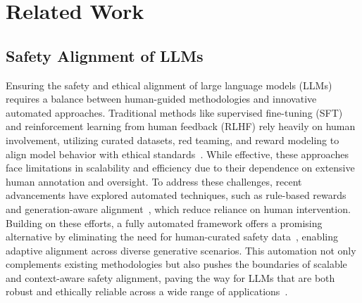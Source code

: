 \section{Related Work}

\subsection{Safety Alignment of LLMs} 
Ensuring the safety and ethical alignment of large language models (LLMs) requires a balance between human-guided methodologies and innovative automated approaches. Traditional methods like supervised fine-tuning (SFT) and reinforcement learning from human feedback (RLHF) rely heavily on human involvement, utilizing curated datasets, red teaming, and reward modeling to align model behavior with ethical standards~\citep{stiennon2020learning, ouyang2022training, llama2, dai2024safe, ji2024beavertails}. While effective, these approaches face limitations in scalability and efficiency due to their dependence on extensive human annotation and oversight. To address these challenges, recent advancements have explored automated techniques, such as rule-based rewards~\citep{murule} and generation-aware alignment~\citep{huang2024catastrophic}, which reduce reliance on human intervention. Building on these efforts, a fully automated framework offers a promising alternative by eliminating the need for human-curated safety data~\citep{murule, huang2024catastrophic}, enabling adaptive alignment across diverse generative scenarios. This automation not only complements existing methodologies but also pushes the boundaries of scalable and context-aware safety alignment, paving the way for LLMs that are both robust and ethically reliable across a wide range of applications~\citep{stiennon2020learning, ouyang2022training, llama2, dai2024safe, ji2024beavertails}.

